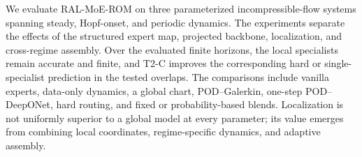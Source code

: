 We evaluate RAL-MoE-ROM on three parameterized incompressible-flow systems spanning
steady, Hopf-onset, and periodic dynamics. The experiments separate the effects of the
structured expert map, projected backbone, localization, and cross-regime assembly. Over
the evaluated finite horizons, the local specialists remain accurate and finite, and
T2-C improves the corresponding hard or single-specialist prediction in the tested
overlaps. The comparisons include vanilla experts, data-only dynamics, a global chart,
POD--Galerkin, one-step POD--DeepONet, hard routing, and fixed or probability-based
blends. Localization is not uniformly superior to a global model at every parameter;
its value emerges from combining local coordinates, regime-specific dynamics, and
adaptive assembly.
